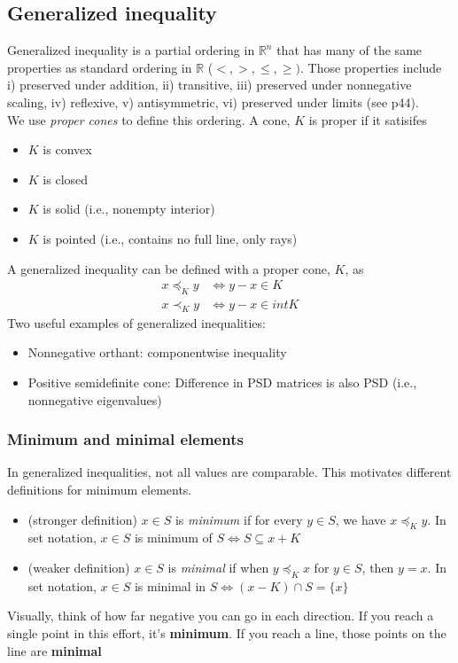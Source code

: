 \documentclass{article}
\begin{document}
\subsection{Generalized inequality} 
Generalized inequality is a partial ordering in $\mathbb{R}^n$ that has many of the same properties as standard ordering in $\mathbb{R}$ ($<, >, \leq, \geq)$. Those properties include i) preserved under addition, ii) transitive, iii) preserved under nonnegative scaling, iv) reflexive, v) antisymmetric, vi) preserved under limits (see p44).\\
We use \textit{proper cones} to define this ordering. A cone, $K$ is proper if it satisifes
\begin{itemize}
  \item $K$ is convex
  \item $K$ is closed
  \item $K$ is solid (i.e., nonempty interior)
  \item $K$ is pointed (i.e., contains no full line, only rays)
\end{itemize}
A generalized inequality can be defined with a proper cone, $K$, as
\begin{align*}
  x \preceq_K y &\Longleftrightarrow y - x \in K\\
  x \prec_K y &\Longleftrightarrow y - x \in int K
\end{align*}
Two useful examples of generalized inequalities:
\begin{itemize}
  \item Nonnegative orthant: componentwise inequality
  \item Positive semidefinite cone: Difference in PSD matrices is also PSD (i.e., nonnegative eigenvalues)
\end{itemize}


\subsubsection{Minimum and minimal elements}
In generalized inequalities, not all values are comparable. This motivates different definitions for minimum elements.
\begin{itemize}
  \item (stronger definition) $x \in S$ is \textit{minimum} if for every $y \in S$, we have $x \preceq_K y$. In set notation, $x \in S$ is minimum of $S \Longleftrightarrow S \subseteq x + K$
  \item (weaker definition) $x \in S$ is \textit{minimal} if when $y \preceq_K x$ for $y \in S$, then $y = x$. In set notation, $x \in S$ is minimal in $S \Longleftrightarrow (x - K) \cap S = \{x\}$
\end{itemize}
Visually, think of how far negative you can go in each direction. If you reach a single point in this effort, it's \textbf{minimum}. If you reach a line, those points on the line are \textbf{minimal}
\end{document}

